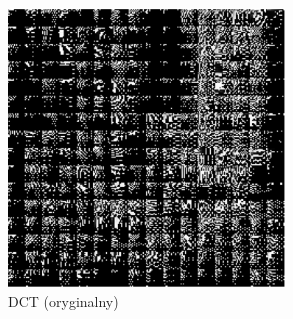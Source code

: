 \begin{figure}[h]
            \vspace{1em}
            \begin{subfigure}{0.3\textwidth}
                \hspace*{\fill} %
            \end{subfigure}
            \hfill
            \begin{subfigure}{0.3\textwidth}
                \centering
                \includegraphics[width=\textwidth]{img/dct_cover.png}
                \caption{DCT (oryginalny)}
            \end{subfigure}
            \hfill
            \begin{subfigure}{0.3\textwidth}
                \centering

\end{subfigure}
\end{figure}
